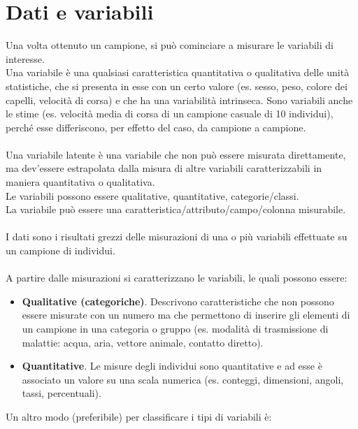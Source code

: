 \documentclass[drafts, 10pt]{book}
\begin{document}
\section{Dati e variabili}
Una volta ottenuto un campione, si può cominciare a misurare le variabili di interesse.
\\
Una variabile è una qualsiasi caratteristica quantitativa o qualitativa delle unità statistiche, che si presenta in esse con un certo valore (es. sesso, peso, colore dei capelli, velocità di corsa) e che ha una variabilità intrinseca. Sono variabili anche le stime (es. velocità media di corsa di un campione casuale di 10 individui), perché esse differiscono, per effetto del caso, da campione a campione.
\\
\\
Una variabile latente è una variabile che non può essere misurata direttamente, ma dev’essere estrapolata dalla misura di altre variabili caratterizzabili in maniera quantitativa o qualitativa.
\\
Le variabili possono essere qualitative, quantitative, categorie/classi.
\\
La variabile può essere una caratteristica/attributo/campo/colonna misurabile.
\\
\\
I dati sono i risultati grezzi delle misurazioni di una o più variabili effettuate su un campione di individui.
\\
\\
A partire dalle misurazioni si caratterizzano le variabili, le quali possono essere:
\begin{itemize}
    \item \textbf{Qualitative (categoriche)}. Descrivono caratteristiche che non possono essere misurate con un numero ma che permettono di inserire gli elementi di un campione in una categoria o gruppo (es. modalità di trasmissione di malattie: acqua, aria, vettore animale, contatto diretto).
    \item \textbf{Quantitative}. Le misure degli individui sono quantitative e ad esse è associato un valore su una scala numerica (es. conteggi, dimensioni, angoli, tassi, percentuali).
\end{itemize}
Un altro modo (preferibile) per classificare i tipi di variabili è:
\end{document}
